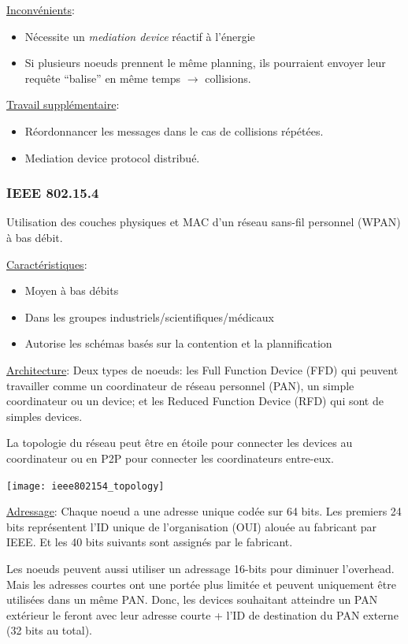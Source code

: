 \documentclass{article}
\begin{document}
\begin{sffamily}
\underline{Inconvénients}:
\begin{itemize}
\item Nécessite un \textit{mediation device} réactif à l'énergie
\item Si plusieurs noeuds prennent le même planning, ils pourraient envoyer
  leur requête ``balise'' en même temps $\rightarrow$ collisions.
\end{itemize}

\underline{Travail supplémentaire}:
\begin{itemize}
\item Réordonnancer les messages dans le cas de collisions répétées.
\item Mediation device protocol distribué.
\end{itemize}

\subsubsection{IEEE 802.15.4}
Utilisation des couches physiques et MAC d'un réseau sans-fil personnel (WPAN)
à bas débit.

\underline{Caractéristiques}:
\begin{itemize}
\item Moyen à bas débits
\item Dans les groupes industriels/scientifiques/médicaux
\item Autorise les schémas basés sur la contention et la plannification
\end{itemize}

\underline{Architecture}:
Deux types de noeuds: les Full Function Device (FFD) qui peuvent travailler
comme un coordinateur de réseau personnel (PAN), un simple coordinateur ou
un device; et les Reduced Function Device (RFD) qui sont de simples devices.

La topologie du réseau peut être en étoile pour connecter les devices au
coordinateur ou en P2P pour connecter les coordinateurs entre-eux.

\texttt{[image: ieee802154\_topology]}

\underline{Adressage}:
Chaque noeud a une adresse unique codée sur 64 bits. Les premiers 24 bits
représentent l'ID unique de l'organisation (OUI) alouée au fabricant par
IEEE. Et les 40 bits suivants sont assignés par le fabricant.

Les noeuds peuvent aussi utiliser un adressage 16-bits pour diminuer
l'overhead. Mais les adresses courtes ont une portée plus limitée et peuvent
uniquement être utilisées dans un même PAN.
Donc, les devices souhaitant atteindre un PAN extérieur le feront
avec leur adresse courte + l'ID de destination du PAN externe
(32 bits au total).


\end{sffamily}
\end{document}
